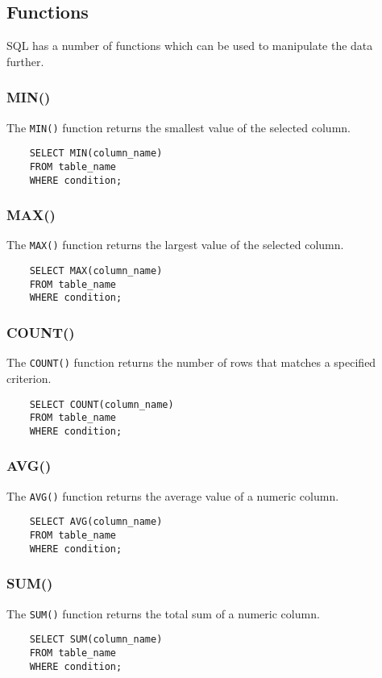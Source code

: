 \documentclass{thomasClass}
\begin{document}
\subsection{Functions}
SQL has a number of functions which can be used to manipulate the data further.
\subsubsection{MIN()}
The \verb|MIN()| function returns the smallest value of the selected column.
\begin{verbatim}
    SELECT MIN(column_name)
    FROM table_name
    WHERE condition;
\end{verbatim}

\subsubsection{MAX()}
The \verb|MAX()| function returns the largest value of the selected column.
\begin{verbatim}
    SELECT MAX(column_name)
    FROM table_name
    WHERE condition;
\end{verbatim}

\subsubsection{COUNT()}
The \verb|COUNT()| function returns the number of rows that matches a specified criterion.
\begin{verbatim}
    SELECT COUNT(column_name)
    FROM table_name
    WHERE condition;
\end{verbatim}

\subsubsection{AVG()}
The \verb|AVG()| function returns the average value of a numeric column. 
\begin{verbatim}
    SELECT AVG(column_name)
    FROM table_name
    WHERE condition;
\end{verbatim}

\subsubsection{SUM()}
The \verb|SUM()| function returns the total sum of a numeric column. 
\begin{verbatim}
    SELECT SUM(column_name)
    FROM table_name
    WHERE condition;
\end{verbatim}
\end{document}
